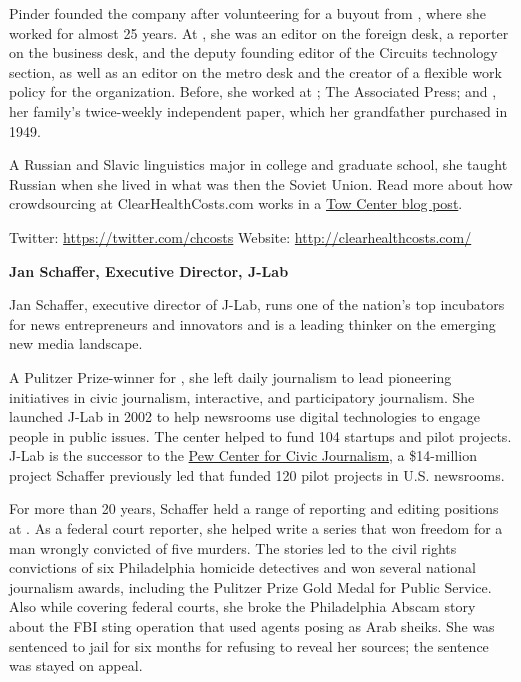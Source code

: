 \begin{itemize}
\begin{itemize}
Pinder founded the company after volunteering for a buyout from , where she worked for almost 25 years. At , she was an editor on the foreign desk, a reporter on the business desk, and the deputy founding editor of the Circuits technology section, as well as an editor on the metro desk and the creator of a flexible work policy for the organization. Before, she worked at ; The Associated Press; and , her family’s twice-weekly independent paper, which her grandfather purchased in 1949.

A Russian and Slavic linguistics major in college and graduate school, she taught Russian when she lived in what was then the Soviet Union. Read more about how crowdsourcing at ClearHealthCosts.com works in a \href{http://towcenter.org/crowdsourcing-in-theory-and-practice}{Tow Center blog post}.\autocite{Towblog}   

Twitter: \href{https://twitter.com/chcosts}{https://twitter.com/chcosts}
Website: \href{http://clearhealthcosts.com/}{http://clearhealthcosts.com/}


\textbf{Jan Schaffer, Executive Director, J-Lab}

Jan Schaffer, executive director of J-Lab, runs one of the nation’s top incubators for news entrepreneurs and innovators and is a leading thinker on the emerging new media landscape.

A Pulitzer Prize-winner for , she left daily journalism to lead pioneering initiatives in civic journalism, interactive, and participatory journalism. She launched J-Lab in 2002 to help newsrooms use digital technologies to engage people in public issues. The center helped to fund 104 startups and pilot projects. J-Lab is the successor to the \href{http://pewcenter.org/}{Pew Center for Civic Journalism}, a \$14-million project Schaffer previously led that funded 120 pilot projects in U.S. newsrooms. 

For more than 20 years, Schaffer held a range of reporting and editing positions at . As a federal court reporter, she helped write a series that won freedom for a man wrongly convicted of five murders. The stories led to the civil rights convictions of six Philadelphia homicide detectives and won several national journalism awards, including the Pulitzer Prize Gold Medal for Public Service. Also while covering federal courts, she broke the Philadelphia Abscam story about the FBI sting operation that used agents posing as Arab sheiks. She was sentenced to jail for six months for refusing to reveal her sources; the sentence was stayed on appeal.


\end{itemize}
\end{itemize}
